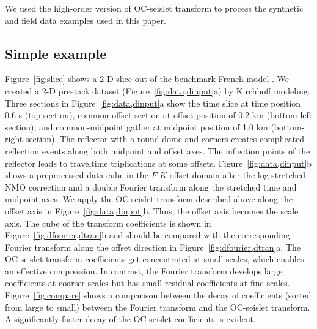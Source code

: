 We used the high-order version of OC-seislet transform to process the
synthetic and field data examples used in this paper.

\subsection{Simple example}

Figure~\ref{fig:slice} shows a 2-D slice out of the benchmark French
model \cite[]{French74}. We created a 2-D prestack dataset
(Figure~\ref{fig:data,dinput}a) by Kirchhoff modeling. Three sections
in Figure~\ref{fig:data,dinput}a show the time slice at time position
0.6 s (top section), common-offset section at offset position of 0.2
km (bottom-left section), and common-midpoint gather at midpoint
position of 1.0 km (bottom-right section). The reflector with a round
dome and corners creates complicated reflection events along both
midpoint and offset axes. The inflection points of the reflector leads
to traveltime triplications at some
offsets. Figure~\ref{fig:data,dinput}b shows a preprocessed data cube
in the $F$-$K$-offset domain after the log-stretched NMO correction
and a double Fourier transform along the stretched time and midpoint
axes. We apply the OC-seislet transform described above along the
offset axis in Figure~\ref{fig:data,dinput}b. Thus, the offset axis
becomes the scale axis. The cube of the transform coefficients is
shown in Figure~\ref{fig:dfourier,dtran}b and should be compared with
the corresponding Fourier transform along the offset direction in
Figure~\ref{fig:dfourier,dtran}a. The OC-seislet transform
coefficients get concentrated at small scales, which enables an
effective compression. In contrast, the Fourier transform develops
large coefficients at coarser scales but has small residual
coefficients at fine scales. Figure~\ref{fig:compare} shows a
comparison between the decay of coefficients (sorted from large to
small) between the Fourier transform and the OC-seislet transform. A
significantly faster decay of the OC-seislet coefficients is evident.




